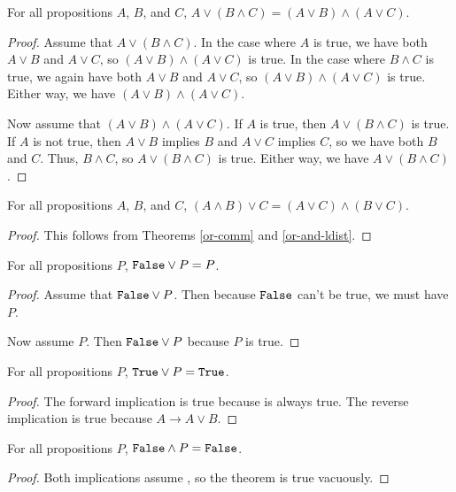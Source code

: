 \documentclass[../math.tex]{subfiles}
\begin{document}
\begin{theorem} \label{or-and-ldist}
    For all propositions $A$, $B$, and $C$, $A \vee (B \wedge C) = (A \vee B)
    \wedge (A \vee C)$.
\end{theorem}
\begin{proof}
    Assume that $A \vee (B \wedge C)$.  In the case where $A$ is true, we have
    both $A \vee B$ and $A \vee C$, so $(A \vee B) \wedge (A \vee C)$ is true.
    In the case where $B \wedge C$ is true, we again have both $A \vee B$ and $A
    \vee C$, so $(A \vee B) \wedge (A \vee C)$ is true.  Either way, we have $(A
    \vee B) \wedge (A \vee C)$.

    Now assume that $(A \vee B) \wedge (A \vee C)$.  If $A$ is true, then $A
    \vee (B \wedge C)$ is true.  If $A$ is not true, then $A \vee B$ implies
    $B$ and $A \vee C$ implies $C$, so we have both $B$ and $C$.  Thus, $B
    \wedge C$, so $A \vee (B \wedge C)$ is true.  Either way, we have $A \vee (B
    \wedge C)$.
\end{proof}

\begin{theorem} \label{or-and-rdist}
    For all propositions $A$, $B$, and $C$, $(A \wedge B) \vee C = (A \vee C)
    \wedge (B \vee C)$.
\end{theorem}
\begin{proof}
    This follows from Theorems \ref{or-comm} and \ref{or-and-ldist}.
\end{proof}

\begin{theorem} \label{or-lfalse}
    For all propositions $P$, $\vtt{False} \vee P = P$.
\end{theorem}
\begin{proof}
    Assume that $\vtt{False} \vee P$.  Then because $\vtt{False}$ can't be true,
    we must have $P$.

    Now assume $P$.  Then $\vtt{False} \vee P$ because $P$ is true.
\end{proof}

\begin{theorem} \label{or-ltrue}
    For all propositions $P$, $\vtt{True} \vee P = \vtt{True}$.
\end{theorem}
\begin{proof}
    The forward implication is true because  is always true.  The
    reverse implication is true because $A \rightarrow A \vee B$.
\end{proof}

\begin{theorem} \label{and-lfalse}
    For all propositions $P$, $\vtt{False} \wedge P = \vtt{False}$.
\end{theorem}
\begin{proof}
    Both implications assume , so the theorem is true vacuously.
\end{proof}
\end{document}
